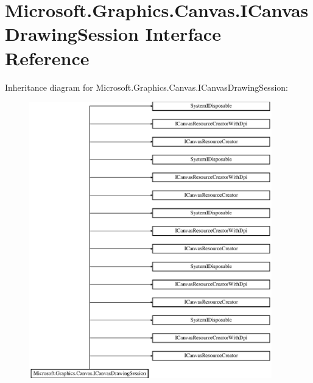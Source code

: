 \hypertarget{interface_microsoft_1_1_graphics_1_1_canvas_1_1_i_canvas_drawing_session}{}\section{Microsoft.\+Graphics.\+Canvas.\+I\+Canvas\+Drawing\+Session Interface Reference}
\label{interface_microsoft_1_1_graphics_1_1_canvas_1_1_i_canvas_drawing_session}
Inheritance diagram for Microsoft.\+Graphics.\+Canvas.\+I\+Canvas\+Drawing\+Session\+:\begin{figure}[H]
\begin{center}
\leavevmode
\includegraphics[height=12.000000cm]{interface_microsoft_1_1_graphics_1_1_canvas_1_1_i_canvas_drawing_session}
\end{center}
\end{figure}
